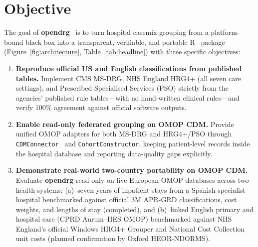 \documentclass[fleqn,10pt]{IOMEDArticle}
\begin{document}
\section{Objective}

The goal of \textbf{opendrg}~\cite{opendrg2026} is to turn hospital casemix grouping from a platform-bound black box into a transparent, verifiable, and portable R~\cite{rcore2026} package (Figure~\ref{fig:architecture}, Table~\ref{tab:headline}) with three specific objectives:

\begin{enumerate}[leftmargin=*,nosep]
    \item \textbf{Reproduce official US and English classifications from published tables.} Implement CMS MS-DRG, NHS England HRG4+ (all seven care settings), and Prescribed Specialised Services (PSO) strictly from the agencies' published rule tables---with no hand-written clinical rules---and verify 100\% agreement against official software outputs.
    \item \textbf{Enable read-only federated grouping on OMOP CDM.} Provide unified OMOP adapters for both MS-DRG and HRG4+/PSO through \texttt{CDMConnector}~\cite{black2025cdmconnector} and \texttt{CohortConstructor}, keeping patient-level records inside the hospital database and reporting data-quality gaps explicitly.
    \item \textbf{Demonstrate real-world two-country portability on OMOP CDM.} Evaluate \textbf{opendrg} read-only on live European OMOP databases across two health systems: (a)~seven years of inpatient stays from a Spanish specialist hospital benchmarked against official 3M APR-GRD classifications, cost weights, and lengths of stay (completed), and (b)~linked English primary and hospital care (CPRD Aurum--HES OMOP) benchmarked against NHS England's official Windows HRG4+ Grouper and National Cost Collection unit costs (planned confirmation by Oxford HEOR-NDORMS).
\end{enumerate}
\end{document}
